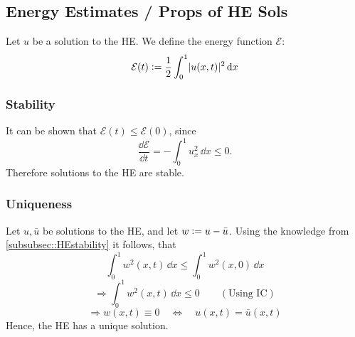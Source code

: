 \subsection{Energy Estimates / Props of HE Sols}
    Let $u$ be a solution to the HE. We define the energy function $\mathcal{E}$:
    $$
        \mathcal{E}(t) \vcentcolon= \frac{1}{2} \int_0^1 \lvert u(x,t)\rvert ^2 \, \dd x
    $$
    \subsubsection{Stability}{\label{subsubsec::HEstability}}
        It can be shown that $\mathcal{E}(t) \leq \mathcal{E}(0)$, since
        $$
            \frac{\dd \mathcal{E}}{\dd t} = - \int_0^1 u_x^2 \, \dd x \leq 0.
        $$
        Therefore solutions to the HE are stable.
    \subsubsection{Uniqueness}
        Let $u, \bar{u}$ be solutions to the HE, and let $w \vcentcolon= u - \bar{u}$.
        Using the knowledge from \ref{subsubsec::HEstability} it follows, that
        $$
            \int_0^1 w^2(x,t) \, \dd x \leq  \int_0^1 w^2(x,0) \, \dd x
        $$
        $$
            \Rightarrow \int_0^1 w^2(x,t) \, \dd x \leq 0 \qquad (\textrm{Using IC})
        $$
        $$
            \Rightarrow w(x,t) \equiv 0\quad \Longleftrightarrow\quad u(x,t) = \bar{u}(x,t)
        $$
        Hence, the HE has a unique solution.
    